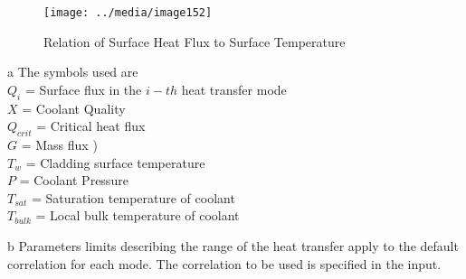 \begin{figure}
    \texttt{[image: ../media/image152]}
    \caption{Relation of Surface Heat Flux to Surface Temperature}
    \label{fig:water_SHF_temp}
\end{figure}

\begin{ThreePartTable}
    \begin{TableNotes}
        \footnotesize
        \item[a] 
		    The symbols used are                                              \\ 
            $   Q_i      $  =   Surface flux in the $i-th$ heat transfer mode \\
            $   X        $  =   Coolant Quality                               \\
            $   Q_{crit} $  =   Critical heat flux                            \\
            $   G        $  =   Mass flux )              \\
            $   T_{w}    $  =   Cladding surface temperature                  \\
            $   P        $  =   Coolant Pressure                  \\
            $   T_{sat}  $  =   Saturation temperature of coolant             \\
            $   T_{bulk} $  =   Local bulk temperature of coolant             \\
        \item[b] 
            Parameters limits describing the range of the heat transfer apply
            to the default correlation for each mode. The correlation to be used
            is specified in the input.
    \end{TableNotes}


\end{ThreePartTable}
